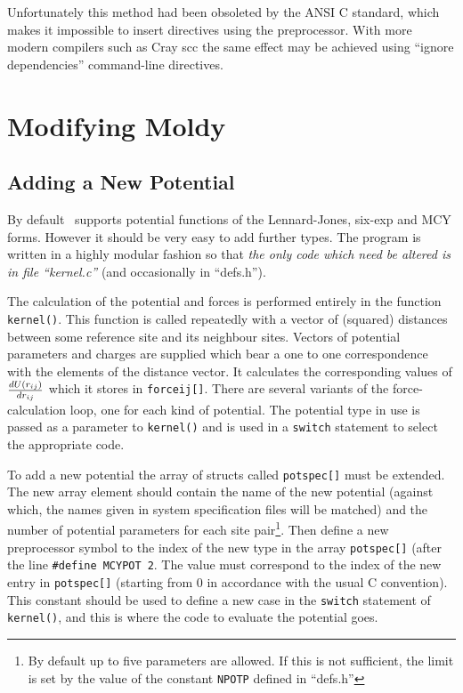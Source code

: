 Unfortunately this method had been obsoleted by the ANSI C standard,
which makes it impossible to insert directives using the preprocessor.
With more modern compilers such as Cray scc the same effect may be
achieved using ``ignore dependencies'' command-line directives.

\section{Modifying Moldy}%
\subsection{Adding a New Potential}
\label{sec:newpot}
By default \moldy\  supports potential functions of the Lennard-Jones,
six-exp and MCY forms.  However it should be very easy to add further
types. The program is written in a highly modular fashion so that {\em
the only code which need be altered is in file ``kernel.c''\/} (and
occasionally in ``defs.h''). 

The calculation of the potential and forces is performed entirely in
the function \verb'kernel()'.  This function is called repeatedly with
a vector of (squared) distances between some reference site and its
neighbour sites.  Vectors of potential parameters and charges are
supplied which bear a one to one correspondence with the elements of
the distance vector.  It calculates the corresponding values of
${dU(r_{ij})} \over {dr_{ij}}$ which it stores in \verb'forceij[]'.
There are several variants of the force-calculation loop, one for each
kind of potential.  The potential type in use is passed as a parameter
to \verb'kernel()' and is used in a \verb'switch' statement to select
the appropriate code. 

To add a new potential the array of structs called \verb'potspec[]'
must be extended.  The new array element should contain the name of
the new potential (against which, the names given in system
specification files will be matched) and the number of potential
parameters for each site pair\footnote{By default up to five
parameters are allowed. If this is not sufficient, the limit is set by
the value of the constant \verb'NPOTP' defined in ``defs.h''}.  Then
define a new preprocessor symbol to the index of the new type in the
array \verb'potspec[]' (after the line
\verb'#define'~\verb'MCYPOT'~\verb'2'.  The value must correspond to
the index of the new entry in \verb'potspec[]' (starting from 0 in
accordance with the usual C convention).  This constant should be used
to define a new case in the \verb'switch' statement of
\verb'kernel()', and this is where the code to evaluate the potential goes.

